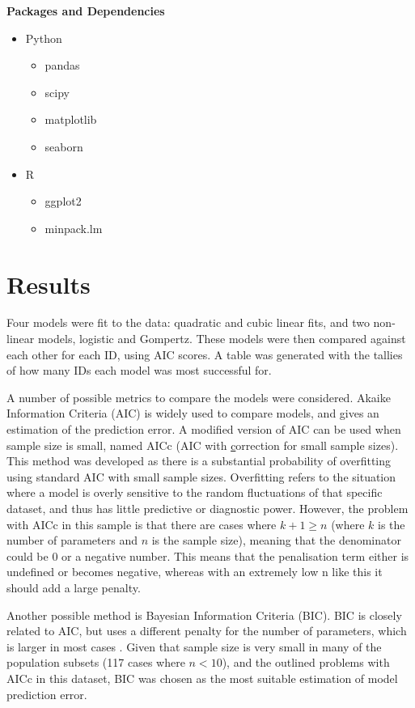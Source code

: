 \documentclass[11pt,a4wide,titlepage]{article}
\begin{document}
\noindent
\textbf{Packages and Dependencies}
\begin{itemize}
    \item Python
    \begin{itemize}
        \item pandas
        \item scipy
        \item matplotlib
        \item seaborn
    \end{itemize}
    \item R
    \begin{itemize}
        \item ggplot2
        \item minpack.lm
    \end{itemize}
\end{itemize}



\section*{Results}
Four models were fit to the data: quadratic and cubic linear fits, and two non-linear models, logistic and Gompertz. These models were then compared against each other for each ID, using AIC scores. A table was generated with the tallies of how many IDs each model was most successful for.

A number of possible metrics to compare the models were considered. Akaike Information Criteria (AIC) is widely used to compare models, and gives an estimation of the prediction error. A modified version of AIC can be used when sample size is small, named AICc (AIC with \underline{c}orrection for small sample sizes). This method was developed as there is a substantial probability of overfitting using standard AIC with small sample sizes. Overfitting refers to the situation where a model is overly sensitive to the random fluctuations of that specific dataset, and thus has little predictive or diagnostic power. However, the problem with AICc in this sample is that there are cases where $k + 1 \ge n$ (where $k$ is the number of parameters and $n$ is the sample size), meaning that the denominator could be 0 or a negative number. This means that the penalisation term either is undefined or becomes negative, whereas with an extremely low n like this it should add a large penalty.

Another possible method is Bayesian Information Criteria (BIC). BIC is closely related to AIC, but uses a different penalty for the number of parameters, which is larger in most cases \citep{stoicaModelorderSelectionReview2004}. Given that sample size is very small in many of the population subsets (117 cases where $n < 10$), and the outlined problems with AICc in this dataset, BIC was chosen as the most suitable estimation of model prediction error. 
\end{document}
